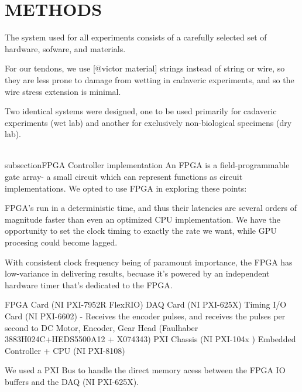 \section{METHODS}

 The system used for all experiments consists of a carefully selected set of hardware, sofware, and materials.

For our tendons, we use [@victor material] strings instead of string or wire, so they are less prone to damage from wetting in cadaveric experiments, and so the wire stress extension is minimal.

 Two identical systems were designed, one to be used primarily for cadaveric experiments (wet lab) and another for exclusively non-biological specimens (dry lab).

\\subsection{FPGA Controller implementation} %
\label{sub:fpga_controller_implementation}
An FPGA is a field-programmable gate array- a small circuit which can represent functions as circuit implementations.
We opted to use FPGA in exploring these points:
\item FPGA's run in a deterministic time, and thus their latencies are several orders of magnitude faster than even an optimized CPU implementation. We have the opportunity to set the clock timing to exactly the rate we want, while GPU procesing could become lagged.
\item With consistent clock frequency being of paramount importance, the FPGA has low-variance in delivering results, becuase it's powered by an independent hardware timer that's dedicated to the FPGA.

FPGA Card (NI PXI-7952R FlexRIO)
DAQ Card (NI PXI-625X)
Timing I/O Card (NI PXI-6602) - Receives the encoder pulses, and receives the pulses per second to 
DC Motor, Encoder, Gear Head  (Faulhaber 3883H024C+HEDS5500A12 + X074343)
PXI Chassis (NI PXI-104x )
Embedded Controller + CPU (NI PXI-8108)




We used a PXI Bus to handle the direct memory acess between the FPGA IO buffers and the DAQ (NI PXI-625X).


